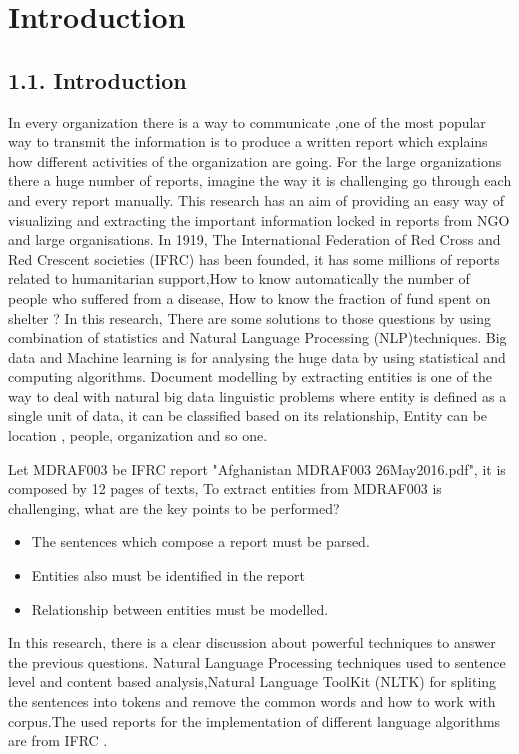\chapter{Introduction}
\section*{1.1. Introduction}
In every organization there is a way to communicate ,one of the most popular way to transmit the information  is  to produce a written report which explains how different activities of the organization are going. For the large organizations there a huge number of reports, imagine the way it is challenging go through  each and every report manually. This research has an aim of providing an easy way of visualizing and extracting the important information locked in reports from NGO and large organisations.
In 1919, The International Federation of Red Cross and Red Crescent societies (IFRC) has been founded, it has some millions of reports related to humanitarian support,How to  know automatically the number of people who suffered from a disease, How to know the  fraction of fund spent on shelter ?  In this research, There are some solutions to those questions by using combination of statistics and Natural Language Processing (NLP)techniques.
Big data and Machine learning is for analysing the huge data by using statistical and computing algorithms. Document modelling by extracting entities is one of the way to deal with natural big data linguistic problems where entity is defined as a single unit of data, it can be classified based on its relationship, Entity can be location , people, organization and so one.

Let MDRAF003 be IFRC report "Afghanistan MDRAF003 26May2016.pdf", it is composed by 12 pages of texts, To extract entities  from MDRAF003 is challenging, what are the key points to be performed? 
\begin{itemize}
\item The sentences which compose a report  must be parsed.
\item  Entities also must be identified in the report
\item Relationship between entities must be modelled.
\end{itemize}
In this research, there is a clear discussion about powerful techniques to answer the previous questions.  Natural  Language Processing techniques used to sentence level and content based analysis,Natural Language ToolKit  (NLTK) for spliting the sentences into tokens and remove the common words and how to work with corpus.The used reports for the implementation of different language algorithms are from IFRC .

